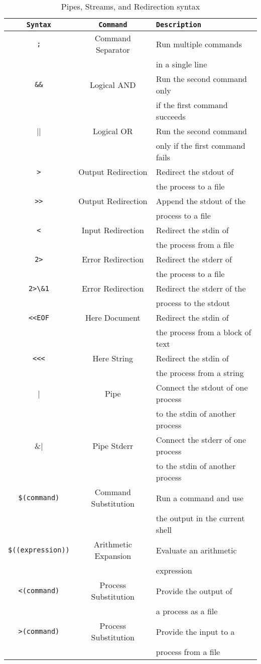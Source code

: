 \begin{table*}[h!]
  \caption{Pipes, Streams, and Redirection syntax}
  \begin{tabular}{c c l}
    \toprule
    \lstinline|Syntax| & \lstinline|Command| & \lstinline|Description| \\
    \midrule
    \lstinline|;| & Command Separator & Run multiple commands\\ & & in a single line\\
    \lstinline|&&| & Logical AND & Run the second command only \\ & & if the first command succeeds\\
    \lstinline|||| & Logical OR & Run the second command \\ & & only if the first command fails\\
    \lstinline|>| & Output Redirection & Redirect the stdout of \\ & & the process to a file\\
    \lstinline|>>| & Output Redirection & Append the stdout of the \\ & & process to a file\\
    \lstinline|<| & Input Redirection & Redirect the stdin of \\ & & the process from a file\\
    \lstinline|2>| & Error Redirection & Redirect the stderr of \\ & & the process to a file\\
    \lstinline|2>\&1| & Error Redirection & Redirect the stderr of the \\ & & process to the stdout\\
    \lstinline|<<EOF| & Here Document & Redirect the stdin of \\ & & the process from a block of text\\
    \lstinline|<<<| & Here String & Redirect the stdin of \\ & & the process from a string\\
    \lstinline||| & Pipe & Connect the stdout of one process \\ & & to the stdin of another process\\
    \lstinline||\&| & Pipe Stderr & Connect the stderr of one process \\ & & to the stdin of another process\\
    \lstinline|$(command)| & Command Substitution & Run a command and use \\ & & the output in the current shell\\
    \lstinline|$((expression))| & Arithmetic Expansion & Evaluate an arithmetic \\ & & expression\\
    \lstinline|<(command)| & Process Substitution & Provide the output of \\ & & a process as a file\\
    \lstinline|>(command)| & Process Substitution & Provide the input to a \\ & & process from a file\\
    \bottomrule
  \end{tabular}
\end{table*}
